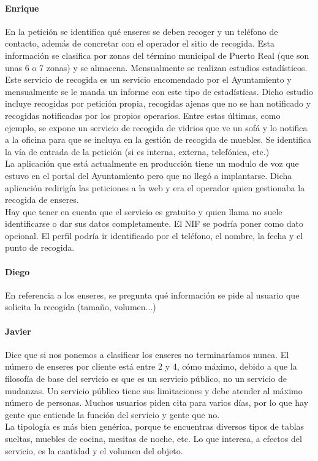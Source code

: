 \paragraph{Enrique} En la petición se identifica qué enseres se deben recoger y un teléfono de contacto, además de concretar con el operador el sitio de recogida. Esta información se clasifica por zonas del término municipal de Puerto Real (que son unas 6 o 7 zonas) y se almacena. Mensualmente se realizan estudios estadísticos. Este servicio de recogida es un servicio encomendado por el Ayuntamiento y mensualmente se le manda un informe con este tipo de estadísticas. Dicho estudio incluye recogidas por petición propia, recogidas ajenas que no se han notificado y recogidas notificadas por los propios operarios.  Entre estas últimas, como ejemplo, se expone un servicio de recogida de vidrios que ve un sofá y lo notifica a la oficina para que se incluya en la gestión de recogida de muebles. Se identifica la vía de entrada de la petición (si es interna, externa, telefónica, etc.) \\  La aplicación que está actualmente en producción tiene un modulo de voz que estuvo en el portal del Ayuntamiento pero que no llegó a implantarse. Dicha aplicación redirigía las peticiones a la web y era el operador quien gestionaba la recogida de enseres. \\ Hay que tener en cuenta que el servicio es gratuito y quien llama no suele identificarse o dar sus datos completamente. El NIF se podría poner como dato opcional. El perfil podría ir identificado por el teléfono, el nombre, la fecha y el punto de recogida.
 
\paragraph{Diego} En referencia a los enseres, se pregunta qué información se pide al usuario que solicita la recogida (tamaño, volumen...)
 
 
\paragraph{Javier} Dice que si nos ponemos a clasificar los enseres no terminaríamos nunca. El número de enseres por cliente está entre 2 y 4, cómo máximo, debido a que la filosofía de base del servicio es que es un servicio público, no un servicio de mudanzas. Un servicio público tiene sus limitaciones y debe atender al máximo número de personas. Muchos usuarios piden cita para varios días, por lo que hay gente que entiende la función del servicio y gente que no.\\ La tipología es más bien genérica, porque te encuentras diversos tipos de tablas sueltas, muebles de cocina, mesitas de noche, etc. Lo que interesa, a efectos del servicio, es la cantidad y el volumen del objeto.
 
